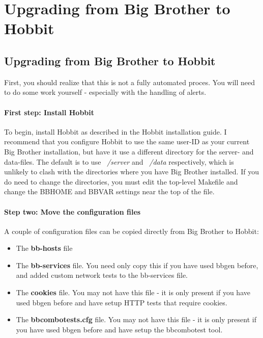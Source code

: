 \chapter{Upgrading from Big Brother to Hobbit}
\label{chap:Upgrading from Big Brother to Hobbit}

\section{Upgrading from Big Brother to Hobbit}


 First, you should realize that this is not a fully automated proces. You will need to do some work yourself - especially with the handling of alerts.
\subsubsection{First step: Install Hobbit}


 To begin, install Hobbit as described in the Hobbit installation guide. I recommend that you configure Hobbit to use the same user-ID as your current Big Brother installation, but have it use a different directory for the server- and data-files. The default is to use \emph{~/server}
 and \emph{~/data}
 respectively, which is unlikely to clash with the directories where you have Big Brother installed. If you do need to change the directories, you must edit the top-level Makefile and change the BBHOME and BBVAR settings near the top of the file.
\subsubsection{Step two: Move the configuration files}


 A couple of configuration files can be copied directly from Big Brother to Hobbit:
\begin{itemize}
\item The \textbf{bb-hosts}
 file 
\item The \textbf{bb-services}
 file. You need only copy this if you have used bbgen before, and added custom network tests to the bb-services file.
\item The \textbf{cookies}
 file. You may not have this file - it is only present if you have used bbgen before and have setup HTTP tests that require cookies.
\item The \textbf{bbcombotests.cfg}
 file. You may not have this file - it is only present if you have used bbgen before and have setup the bbcombotest tool.

\end{itemize}


